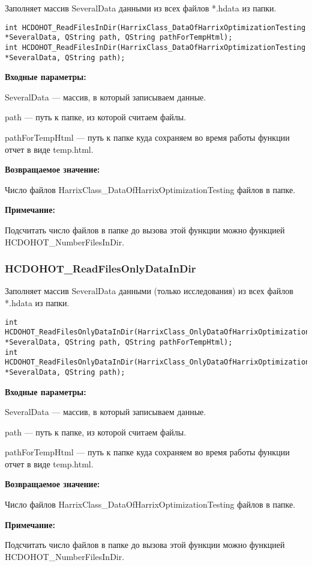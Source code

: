 \documentclass[a4paper,12pt]{article}
\begin{document}
Заполняет массив SeveralData данными из всех файлов *.hdata из папки.


\begin{lstlisting}[label=code_syntax_HCDOHOT_ReadFilesInDir,caption=Синтаксис]
int HCDOHOT_ReadFilesInDir(HarrixClass_DataOfHarrixOptimizationTesting *SeveralData, QString path, QString pathForTempHtml);
int HCDOHOT_ReadFilesInDir(HarrixClass_DataOfHarrixOptimizationTesting *SeveralData, QString path);
\end{lstlisting}

\textbf{Входные параметры:}

SeveralData --- массив, в который записываем данные.

path --- путь к папке, из которой считаем файлы.

pathForTempHtml --- путь к папке куда сохраняем во время работы функции отчет в виде temp.html.

\textbf{Возвращаемое значение:}

Число файлов HarrixClass\_DataOfHarrixOptimizationTesting файлов в папке.

\textbf{Примечание:}

Подсчитать число файлов в папке до вызова этой функции можно функцией HCDOHOT\_NumberFilesInDir.



\subsubsection{HCDOHOT\_ReadFilesOnlyDataInDir}\label{HCDOHOT_ReadFilesOnlyDataInDir}

Заполняет массив SeveralData данными (только исследования) из всех файлов *.hdata из папки.


\begin{lstlisting}[label=code_syntax_HCDOHOT_ReadFilesOnlyDataInDir,caption=Синтаксис]
int HCDOHOT_ReadFilesOnlyDataInDir(HarrixClass_OnlyDataOfHarrixOptimizationTesting *SeveralData, QString path, QString pathForTempHtml);
int HCDOHOT_ReadFilesOnlyDataInDir(HarrixClass_OnlyDataOfHarrixOptimizationTesting *SeveralData, QString path);
\end{lstlisting}

\textbf{Входные параметры:}

SeveralData --- массив, в который записываем данные.

path --- путь к папке, из которой считаем файлы.

pathForTempHtml --- путь к папке куда сохраняем во время работы функции отчет в виде temp.html.

\textbf{Возвращаемое значение:}


Число файлов HarrixClass\_DataOfHarrixOptimizationTesting файлов в папке.

\textbf{Примечание:}

Подсчитать число файлов в папке до вызова этой функции можно функцией HCDOHOT\_NumberFilesInDir.

\end{document}
